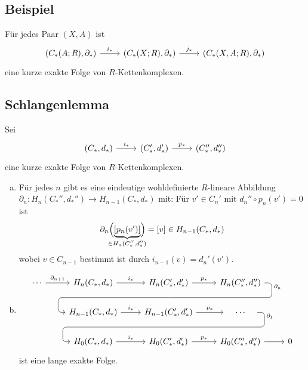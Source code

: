 \subsection[Beispiel einer kurzen exakten Folge von Kettenkomplexen]{Beispiel} %
\label{sub:811}
Für jedes Paar $(X,A)$ ist 
\[
	\begin{tikzcd}
		\enbrace*{C_*(A;R),\partial_*} \rar["i_*"] & \enbrace*{C_*(X;R),\partial_*} \rar["j_*"] & \enbrace*{C_*(X,A;R),\partial_*}   
	\end{tikzcd}
\]
eine kurze exakte Folge von $R$-Kettenkomplexen.

\subsection{Schlangenlemma} %
\label{sub:812}
Sei 
\[
	\begin{tikzcd}
		(C_*,d_*) \rar["i_*"] & (C_*',d_*') \rar["p_*"] & (C_*'',d_*'')
	\end{tikzcd}
\]
eine kurze exakte Folge von $R$-Kettenkomplexen.
\begin{enumerate}[a)]
	\item Für jedes $n$ gibt es eine eindeutige wohldefinierte $R$-lineare Abbildung $\partial_n \colon H_n(C_*'',d_*'') \to H_{n-1}(C_*,d_*)$ mit:
	Für $v' \in C_n'$ mit $d_n'' \circ p_n(v')=0$ ist 
	\[
		\partial_n \enbrace[\Big]{\underbrace{\benbrace*{p_n(v')}}_{\mathclap{\in H_n(C_*'',d_*'')}} } = [v] \in H_{n-1}(C_*,d_*)
	\]
	wobei $v \in C_{n-1}$ bestimmt ist durch $i_{n-1}(v)= d_n'(v')$.
	\item 
	\[
		\begin{tikzcd}
			\cdots \rar["\partial_{n+1}"] & H_n(C_*,d_*) \rar["i_*"] & 
				H_n(C_*',d_*') \arrow[d, phantom, ""{coordinate, name=Z}] \rar["p_*"] 
					& H_n(C_*'',d_*'') \arrow[dll, "\partial_n" very near start, rounded corners, to path={
																	-- ([xshift=2ex]\tikztostart.east)
																	|- (Z) [near end]\tikztonodes
																	-| ([xshift=-2ex]\tikztotarget.west)
																	-- (\tikztotarget)
																	}] & \\
			& H_{n-1}(C_*,d_*) \rar["i_*"] 
				& H_{n-1}(C_*',d_*') \rar["p_*"] \arrow[d, phantom, ""{coordinate, name=R}]
					& \quad \cdots  \quad \arrow[dll, "\partial_1" very near start, rounded corners, to path={
																	-- ([xshift=2ex]\tikztostart.east)
																	|- (R) [near end]\tikztonodes
																	-| ([xshift=-2ex]\tikztotarget.west)
																	-- (\tikztotarget)
																	}]& \\
			& H_0(C_*,d_*) \rar["i_*"] & H_0(C_*',d_*') \rar["p_*"] & H_0(C_*'',d_*'') \rar & 0
		\end{tikzcd}
	\]
	ist eine lange exakte Folge. 
\end{enumerate}
